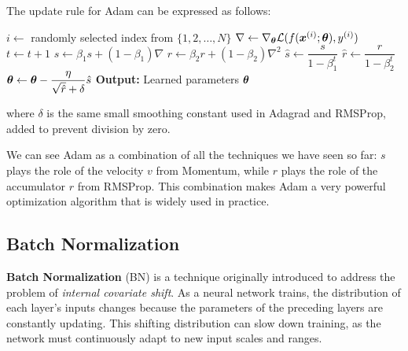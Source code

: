 The update rule for Adam can be expressed as follows:
\begin{algorithm}[H]
    \caption{Adam}
    \begin{algorithmic}[1]
        \Require{Decay rates $\beta_1, \beta_2 \in [0, 1)$}
            \State $i \leftarrow$ randomly selected index from $\{1, 2, \ldots, N\}$
            \State $\nabla \leftarrow \nabla_{\boldsymbol{\theta}} \mathcal{L}(f(\boldsymbol{x}^{(i)}; \boldsymbol{\theta}), y^{(i)})$
            \State $t \leftarrow t + 1$
            \State $s \leftarrow \beta_1 s + (1 - \beta_1) \nabla$ 
            \State $r \leftarrow \beta_2 r + (1 - \beta_2) \nabla^2$ 
            \State $\hat{s} \leftarrow \dfrac{s}{1 - \beta_1^t}$ 
            \State $\hat{r} \leftarrow \dfrac{r}{1 - \beta_2^t}$ 
            \State $\boldsymbol{\theta} \leftarrow \boldsymbol{\theta} - \dfrac{\eta}{\sqrt{\hat{r}} + \delta} \hat{s}$ 
        \EndWhile
        \State \textbf{Output:} Learned parameters $\boldsymbol{\theta}$
    \end{algorithmic}
\end{algorithm}
where $\delta$ is the same small smoothing constant used in Adagrad and RMSProp, added to prevent division by zero.

We can see Adam as a combination of all the techniques we have seen so far: $s$ plays the role of the velocity $v$ from Momentum, while $r$ plays the role of the accumulator $r$ from RMSProp. This combination makes Adam a very powerful optimization algorithm that is widely used in practice.

\subsection{Batch Normalization}
\textbf{Batch Normalization} (BN) is a technique originally introduced to address the problem of \textit{internal covariate shift}.
As a neural network trains, the distribution of each layer's inputs changes because the parameters of the preceding layers are constantly updating.
This shifting distribution can slow down training, as the network must continuously adapt to new input scales and ranges.

